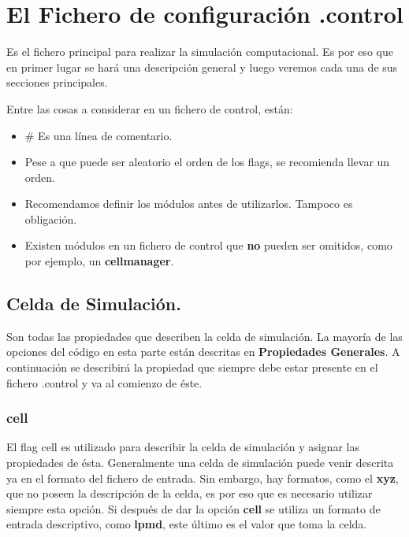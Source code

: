 \section{El Fichero de configuraci\'on .control}

Es el fichero principal para realizar la simulaci\'on computacional. Es por eso que en primer lugar se har\'a una descripci\'on general y luego veremos cada una de sus secciones principales.

Entre las cosas a considerar en un fichero de control, est\'an:

\begin{itemize}
 \item \# Es una l\'inea de comentario.
 \item Pese a que puede ser aleatorio el orden de los flags, se recomienda llevar un orden.
 \item Recomendamos definir los m\'odulos antes de utilizarlos. Tampoco es obligaci\'on.
 \item Existen m\'odulos en un fichero de control que \textbf{no} pueden ser omitidos, como por ejemplo, un \textbf{cellmanager}.
\end{itemize}

\subsection{Celda de Simulaci\'on.}

Son todas las propiedades que describen la celda de simulaci\'on. La mayor\'ia de las opciones del c\'odigo en esta parte est\'an descritas en \textbf{Propiedades Generales}. A continuaci\'on se describir\'a la propiedad que siempre debe estar presente en el fichero .control y va al comienzo de \'este.

\subsubsection{cell}

El flag cell es utilizado para describir la celda de simulaci\'on y asignar las propiedades de \'esta. Generalmente una celda de simulaci\'on puede venir descrita ya en el formato del fichero de entrada. Sin embargo, hay formatos, como el \textbf{xyz}, que no poseen la descripci\'on de la celda, es por eso que es necesario utilizar siempre esta opci\'on. Si despu\'es de dar la opci\'on \textbf{cell} se utiliza un formato de entrada descriptivo, como \textbf{lpmd}, este \'ultimo es el valor que toma la celda.

